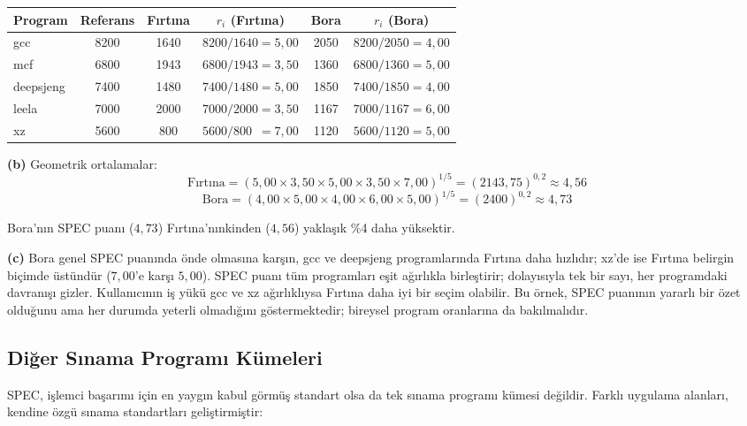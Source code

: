 \begin{ornek}[2.9]
\begin{center}
\small
\begin{tabular}{lccccc}
\toprule
\textbf{Program} & \textbf{Referans} & \textbf{Fırtına} & $r_i$ \textbf{(Fırtına)} & \textbf{Bora} & $r_i$ \textbf{(Bora)} \\
\midrule
gcc         & 8200 & 1640 & $8200/1640 = 5{,}00$ & 2050 & $8200/2050 = 4{,}00$ \\
mcf         & 6800 & 1943 & $6800/1943 = 3{,}50$ & 1360 & $6800/1360 = 5{,}00$ \\
deepsjeng   & 7400 & 1480 & $7400/1480 = 5{,}00$ & 1850 & $7400/1850 = 4{,}00$ \\
leela       & 7000 & 2000 & $7000/2000 = 3{,}50$ & 1167 & $7000/1167 = 6{,}00$ \\
xz          & 5600 & 800  & $5600/800\;\: = 7{,}00$ & 1120 & $5600/1120 = 5{,}00$ \\
\bottomrule
\end{tabular}
\end{center}

\textbf{(b)} Geometrik ortalamalar:
\[
\text{Fırtına} = (5{,}00 \times 3{,}50 \times 5{,}00 \times 3{,}50 \times 7{,}00)^{1/5} = (2143{,}75)^{0{,}2} \approx 4{,}56
\]
\[
\text{Bora} = (4{,}00 \times 5{,}00 \times 4{,}00 \times 6{,}00 \times 5{,}00)^{1/5} = (2400)^{0{,}2} \approx 4{,}73
\]

Bora'nın SPEC puanı ($4{,}73$) Fırtına'nınkinden ($4{,}56$) yaklaşık \%4 daha yüksektir.

\textbf{(c)} Bora genel SPEC puanında önde olmasına karşın, gcc ve deepsjeng programlarında Fırtına daha hızlıdır; xz'de ise Fırtına belirgin biçimde üstündür ($7{,}00$'e karşı $5{,}00$). SPEC puanı tüm programları eşit ağırlıkla birleştirir; dolayısıyla tek bir sayı, her programdaki davranışı gizler. Kullanıcının iş yükü gcc ve xz ağırlıklıysa Fırtına daha iyi bir seçim olabilir. Bu örnek, SPEC puanının yararlı bir özet olduğunu ama her durumda yeterli olmadığını göstermektedir; bireysel program oranlarına da bakılmalıdır.
\end{ornek}

\subsection{Diğer Sınama Programı Kümeleri}
\label{subsec:diger-sinama}

SPEC, işlemci başarımı için en yaygın kabul görmüş standart olsa da tek sınama programı kümesi değildir. Farklı uygulama alanları, kendine özgü sınama standartları geliştirmiştir:

